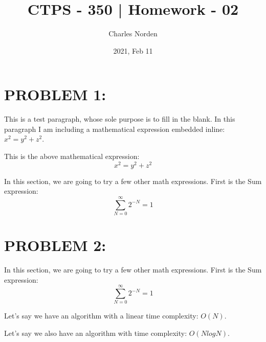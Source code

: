 \documentclass[12pt,letterpaper]{article}
\begin{document}
\title{CTPS - 350 | Homework - 02}
\author{Charles Norden}
\date{2021, Feb 11}
\maketitle

\section*{PROBLEM 1:}
This is a test paragraph, whose sole purpose is to fill in the blank. In this paragraph I am including a mathematical expression embedded inline: $x^2 = y^2 + z^2$.

This is the above mathematical expression:
\[x^2 = y^2 + z^2\]

In this section, we are going to try a few other math expressions. First is the Sum expression:
\[ \sum_{N=0}^{\infty} 2^{-N} = 1 \]

\section*{PROBLEM 2:}
In this section, we are going to try a few other math expressions. First is the Sum expression:
\[ \sum_{N=0}^{\infty} 2^{-N} = 1 \]

Let's say we have an algorithm with a linear time complexity: $O(N)$.

Let's say we also have an algorithm with time complexity: $O(N logN)$.
\end{document}
